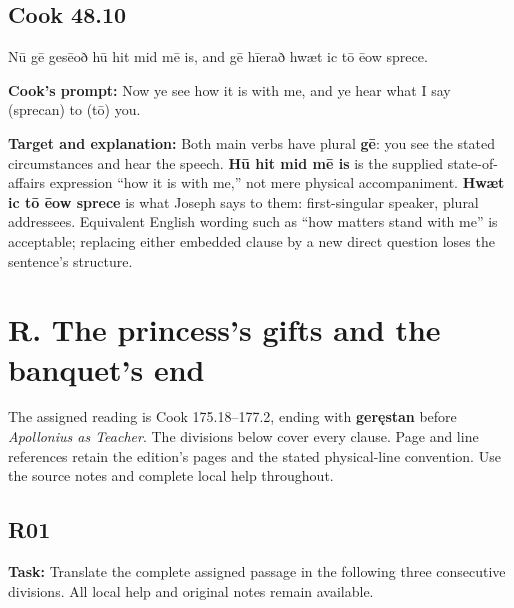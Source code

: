 \par\begin{minipage}{\linewidth}\raggedright
\subsection*{Cook 48.10}

Nū gē gesēoð hū hit mid mē is, and gē hīerað hwæt ic tō ēow sprece.

\textbf{Cook’s prompt:} Now ye see how it is with me, and ye hear what I say (sprecan) to (tō) you.

\textbf{Target and explanation:} Both main verbs have plural \textbf{gē}: you see the stated circumstances and hear the speech. \textbf{Hū hit mid mē is} is the supplied state-of-affairs expression “how it is with me,” not mere physical accompaniment. \textbf{Hwæt ic tō ēow sprece} is what Joseph says to them: first-singular speaker, plural addressees. Equivalent English wording such as “how matters stand with me” is acceptable; replacing either embedded clause by a new direct question loses the sentence’s structure.

\end{minipage}\par\addvspace{4pt}

\section*{R. The princess’s gifts and the banquet’s end}

The assigned reading is Cook 175.18–177.2, ending with \textbf{geręstan} before \emph{Apollonius as Teacher}. The divisions below cover every clause. Page and line references retain the edition’s pages and the stated physical-line convention. Use the source notes and complete local help throughout.

\subsection*{R01}

\textbf{Task:} Translate the complete assigned passage in the following three consecutive divisions. All local help and original notes remain available.

